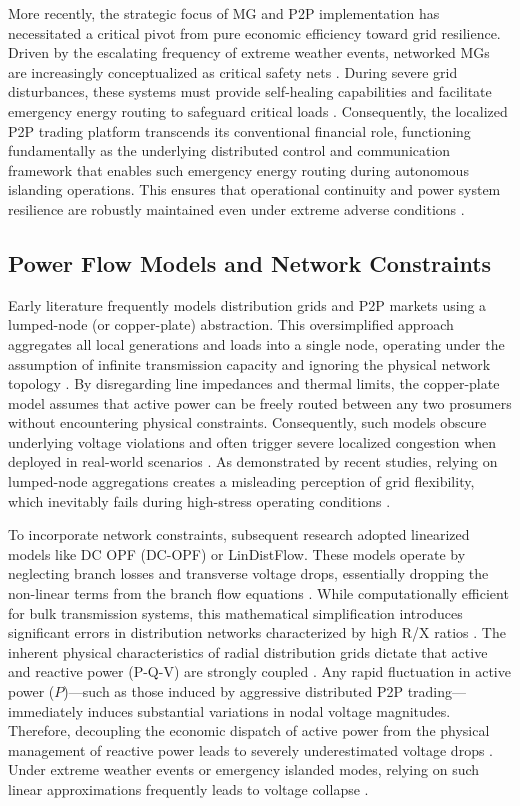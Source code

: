 More recently, the strategic focus of MG and P2P implementation has necessitated a critical pivot from pure economic efficiency toward grid resilience. Driven by the escalating frequency of extreme weather events, networked MGs are increasingly conceptualized as critical safety nets \cite{Li2017Networked, Hu2026Region}. During severe grid disturbances, these systems must provide self-healing capabilities and facilitate emergency energy routing to safeguard critical loads \cite{Chen2020}. Consequently, the localized P2P trading platform transcends its conventional financial role, functioning fundamentally as the underlying distributed control and communication framework that enables such emergency energy routing during autonomous islanding operations. This ensures that operational continuity and power system resilience are robustly maintained even under extreme adverse conditions \cite{Bhusal2020}.

\subsection{Power Flow Models and Network Constraints}
Early literature frequently models distribution grids and P2P markets using a lumped-node (or copper-plate) abstraction. This oversimplified approach aggregates all local generations and loads into a single node, operating under the assumption of infinite transmission capacity and ignoring the physical network topology \cite{Guerrero2021_Network}. By disregarding line impedances and thermal limits, the copper-plate model assumes that active power can be freely routed between any two prosumers without encountering physical constraints. Consequently, such models obscure underlying voltage violations and often trigger severe localized congestion when deployed in real-world scenarios \cite{Guerrero2018_Decentralized}. As demonstrated by recent studies, relying on lumped-node aggregations creates a misleading perception of grid flexibility, which inevitably fails during high-stress operating conditions \cite{lannoye2012evaluation, javed2024analyzing}.

To incorporate network constraints, subsequent research adopted linearized models like DC OPF (DC-OPF) or LinDistFlow. These models operate by neglecting branch losses and transverse voltage drops, essentially dropping the non-linear terms from the branch flow equations \cite{paudel2020peer}. While computationally efficient for bulk transmission systems, this mathematical simplification introduces significant errors in distribution networks characterized by high R/X ratios \cite{Patari2021}. The inherent physical characteristics of radial distribution grids dictate that active and reactive power (P-Q-V) are strongly coupled \cite{Hashmi2020}. Any rapid fluctuation in active power ($P$)—such as those induced by aggressive distributed P2P trading—immediately induces substantial variations in nodal voltage magnitudes. Therefore, decoupling the economic dispatch of active power from the physical management of reactive power leads to severely underestimated voltage drops \cite{Pareek2020}. Under extreme weather events or emergency islanded modes, relying on such linear approximations frequently leads to voltage collapse \cite{Polat2025, eajal2018existence}.

